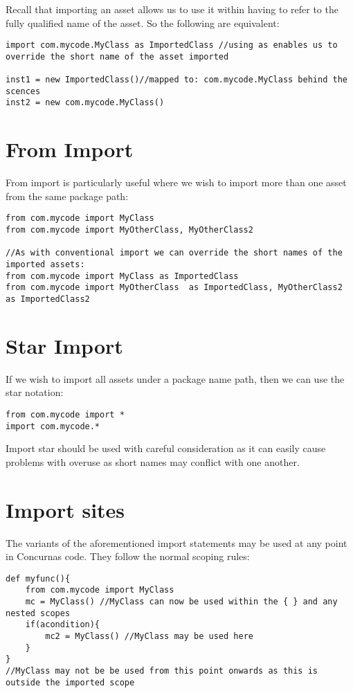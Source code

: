 \documentclass[conc-doc]{subfiles}
\begin{document}
Recall that importing an asset allows us to use it within having to refer to the fully qualified name of the asset. So the following are equivalent:

\begin{lstlisting}
import com.mycode.MyClass as ImportedClass //using as enables us to override the short name of the asset imported

inst1 = new ImportedClass()//mapped to: com.mycode.MyClass behind the scences 
inst2 = new com.mycode.MyClass()
\end{lstlisting}

\section{From Import}
From import is particularly useful where we wish to import more than one asset from the same package path:
\begin{lstlisting}
from com.mycode import MyClass 
from com.mycode import MyOtherClass, MyOtherClass2

//As with conventional import we can override the short names of the imported assets:
from com.mycode import MyClass as ImportedClass
from com.mycode import MyOtherClass  as ImportedClass, MyOtherClass2  as ImportedClass2
\end{lstlisting}

\section{Star Import}
If we wish to import all assets under a package name path, then we can use the star notation:
\begin{lstlisting}
from com.mycode import *
import com.mycode.*
\end{lstlisting}

Import star should be used with careful consideration as it can easily cause problems with overuse as short names may conflict with one another.

\section{Import sites}
The variants of the aforementioned import statements may be used at any point in Concurnas code. They follow the normal scoping rules:
\begin{lstlisting}
def myfunc(){
	from com.mycode import MyClass
	mc = MyClass() //MyClass can now be used within the { } and any nested scopes
	if(acondition){
		mc2 = MyClass() //MyClass may be used here
	}
}
//MyClass may not be be used from this point onwards as this is outside the imported scope
\end{lstlisting}
\end{document}
